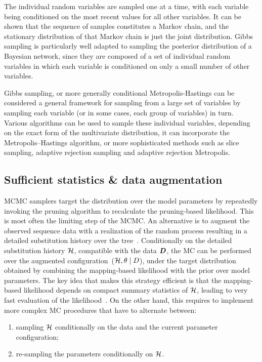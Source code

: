 The individual random variables are sampled one at a time, with each variable being conditioned on the most recent values for all other variables.
It can be shown that the sequence of samples constitutes a Markov chain, and the stationary distribution of that Markov chain is just the joint distribution.
Gibbs sampling is particularly well adapted to sampling the posterior distribution of a Bayesian network, since they are composed of a set of individual random variables in which each variable is conditioned on only a small number of other variables.

Gibbs sampling, or more generally conditional Metropolis-Hastings can be considered a general framework for sampling from a large set of variables by sampling each variable (or in some cases, each group of variables) in turn.
Various algorithms can be used to sample these individual variables, depending on the exact form of the multivariate distribution, it can incorporate the Metropolis–Hastings algorithm, or more sophisticated methods such as slice sampling, adaptive rejection sampling and adaptive rejection Metropolis.

\subsection{Sufficient statistics \& data augmentation}
\label{subsec:suffstats-data-augmentation}

MCMC samplers target the distribution over the model parameters by repeatedly invoking the pruning algorithm to recalculate the pruning-based likelihood.
This is most often the limiting step of the \acrshort{MCMC}.
An alternative is to augment the observed sequence data with a realization of the random process resulting in a detailed substitution history over the tree~\citep{Nielsen2002,Rodrigue2008}.
Conditionally on the detailed substitution history $\mathcal{H}$, compatible with the data $\bm{D}$, the \acrshort{MC} can be performed over the augmented configuration~($\mathcal{H}, \theta \mid D$), under the target distribution obtained by combining the mapping-based likelihood with the prior over model parameters.
The key idea that makes this strategy efficient is that the mapping-based likelihood depends on compact summary statistics of $\mathcal{H}$, leading to very fast evaluation of the likelihood~\citep{Lartillot2006,DeKoning2010,Romiguier2012,Irvahn2014,Davydov2016,Gueguen2018}.
On the other hand, this requires to implement more complex \acrshort{MC} procedures that have to alternate between:
\begin{enumerate}
    \item sampling $\mathcal{H}$ conditionally on the data and the current parameter configuration;
    \item re-sampling the parameters conditionally on $\mathcal{H}$.
\end{enumerate}

